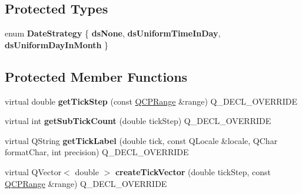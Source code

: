 \subsection*{Protected Types}
\begin{DoxyCompactItemize}
\item 
enum {\bfseries Date\+Strategy} \{ {\bfseries ds\+None}, 
{\bfseries ds\+Uniform\+Time\+In\+Day}, 
{\bfseries ds\+Uniform\+Day\+In\+Month}
 \}\hypertarget{classQCPAxisTickerDateTime_af2c7c60821a6234ca7a172f42ef7f1d8}{}\label{classQCPAxisTickerDateTime_af2c7c60821a6234ca7a172f42ef7f1d8}

\end{DoxyCompactItemize}
\subsection*{Protected Member Functions}
\begin{DoxyCompactItemize}
\item 
virtual double {\bfseries get\+Tick\+Step} (const \hyperlink{classQCPRange}{Q\+C\+P\+Range} \&range) Q\+\_\+\+D\+E\+C\+L\+\_\+\+O\+V\+E\+R\+R\+I\+DE\hypertarget{classQCPAxisTickerDateTime_a0560c14a3f87bb99ab136aca8321b32a}{}\label{classQCPAxisTickerDateTime_a0560c14a3f87bb99ab136aca8321b32a}

\item 
virtual int {\bfseries get\+Sub\+Tick\+Count} (double tick\+Step) Q\+\_\+\+D\+E\+C\+L\+\_\+\+O\+V\+E\+R\+R\+I\+DE\hypertarget{classQCPAxisTickerDateTime_a78dece0d51426a3c310528d413e09193}{}\label{classQCPAxisTickerDateTime_a78dece0d51426a3c310528d413e09193}

\item 
virtual Q\+String {\bfseries get\+Tick\+Label} (double tick, const Q\+Locale \&locale, Q\+Char format\+Char, int precision) Q\+\_\+\+D\+E\+C\+L\+\_\+\+O\+V\+E\+R\+R\+I\+DE\hypertarget{classQCPAxisTickerDateTime_a4dc6a03f7ea5c619477528a683ed5c18}{}\label{classQCPAxisTickerDateTime_a4dc6a03f7ea5c619477528a683ed5c18}

\item 
virtual Q\+Vector$<$ double $>$ {\bfseries create\+Tick\+Vector} (double tick\+Step, const \hyperlink{classQCPRange}{Q\+C\+P\+Range} \&range) Q\+\_\+\+D\+E\+C\+L\+\_\+\+O\+V\+E\+R\+R\+I\+DE\hypertarget{classQCPAxisTickerDateTime_a44c2c09a303d281801b69226e243047d}{}\label{classQCPAxisTickerDateTime_a44c2c09a303d281801b69226e243047d}

\end{DoxyCompactItemize}
